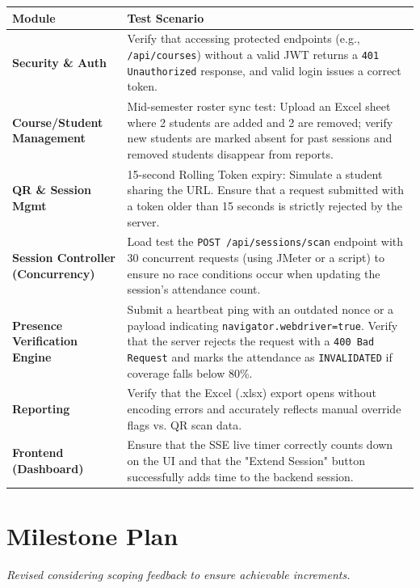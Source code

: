 \documentclass[11pt,a4paper]{article}
\begin{document}
\begin{center}
\begin{tabularx}{\textwidth}{|l|X|}
\hline
\textbf{Module} & \textbf{Test Scenario} \\
\hline
\textbf{Security \& Auth} & Verify that accessing protected endpoints (e.g., \texttt{/api/courses}) without a valid JWT returns a \texttt{401 Unauthorized} response, and valid login issues a correct token. \\
\hline
\textbf{Course/Student Management} & Mid-semester roster sync test: Upload an Excel sheet where 2 students are added and 2 are removed; verify new students are marked absent for past sessions and removed students disappear from reports. \\
\hline
\textbf{QR \& Session Mgmt} & 15-second Rolling Token expiry: Simulate a student sharing the URL. Ensure that a request submitted with a token older than 15 seconds is strictly rejected by the server. \\
\hline
\textbf{Session Controller (Concurrency)} & Load test the \texttt{POST /api/sessions/scan} endpoint with 30 concurrent requests (using JMeter or a script) to ensure no race conditions occur when updating the session's attendance count. \\
\hline
\textbf{Presence Verification Engine} & Submit a heartbeat ping with an outdated nonce or a payload indicating \texttt{navigator.webdriver=true}. Verify that the server rejects the request with a \texttt{400 Bad Request} and marks the attendance as \texttt{INVALIDATED} if coverage falls below 80\%. \\
\hline
\textbf{Reporting} & Verify that the Excel (.xlsx) export opens without encoding errors and accurately reflects manual override flags vs. QR scan data. \\
\hline
\textbf{Frontend (Dashboard)} & Ensure that the SSE live timer correctly counts down on the UI and that the "Extend Session" button successfully adds time to the backend session. \\
\hline
\end{tabularx}
\end{center}

\section{Milestone Plan}

\textit{Revised considering scoping feedback to ensure achievable increments.}
\end{document}
